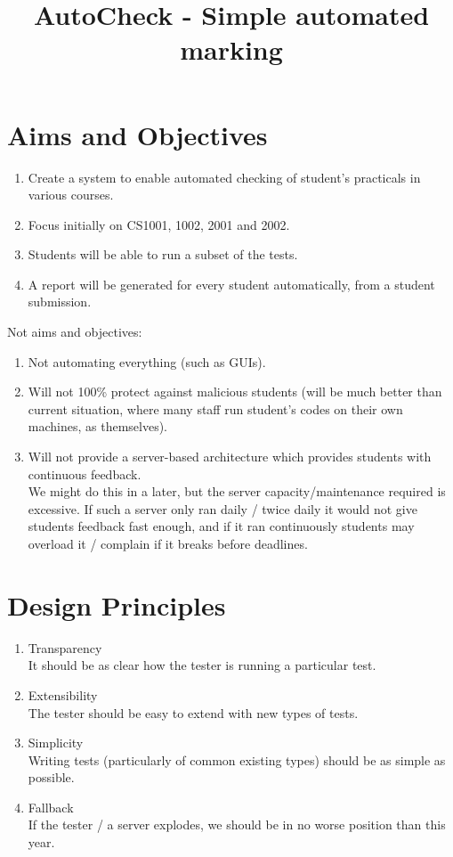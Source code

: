 \documentclass[11pt]{article}
\title{AutoCheck - Simple automated marking}
\begin{document}
\maketitle

\section{Aims and Objectives}

\begin{enumerate}
\item Create a system to enable automated checking of student's practicals in various courses.
\item Focus initially on CS1001, 1002, 2001 and 2002.
\item Students will be able to run a subset of the tests.
\item A report will be generated for every student automatically, from a student submission.
\end{enumerate}

Not aims and objectives:

\begin{enumerate}
\item Not automating everything (such as GUIs).
\item Will not 100\% protect against malicious students (will be much better than current situation, where many staff run student's codes on their own machines, as themselves).
\item Will not provide a server-based architecture which provides students with continuous feedback.\\
We might do this in a later, but the server capacity/maintenance required is excessive. If such a server only ran daily / twice daily it would not give students feedback fast enough, and if it ran continuously students may overload it / complain if it breaks before deadlines.
\end{enumerate}

\section{Design Principles}

\begin{enumerate}
\item Transparency\\
It should be as clear how the tester is running a particular test.
\item Extensibility\\
The tester should be easy to extend with new types of tests.
\item Simplicity\\
Writing tests (particularly of common existing types) should be as simple as possible.
\item Fallback\\
If the tester / a server explodes, we should be in no worse position than this year.
\end{enumerate}
\end{document}
